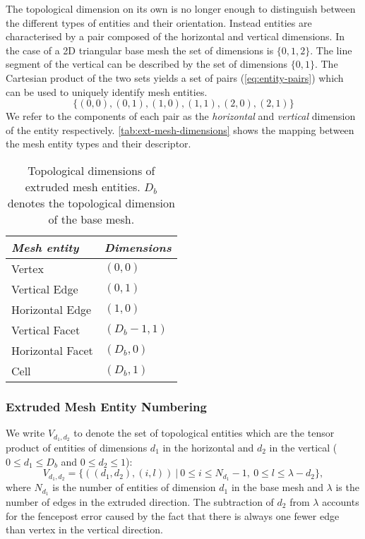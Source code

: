 \documentclass[11pt, a4paper]{scrartcl}
\begin{document}
The topological dimension on its own is no longer enough to
distinguish between the different types of entities and their
orientation. Instead entities are characterised by a pair composed of
the horizontal and vertical dimensions. In the case of a 2D triangular
base mesh the set of dimensions is $\{0, 1, 2\}$. The line segment of
the vertical can be described by the set of dimensions $\{0, 1\}$. The
Cartesian product of the two sets yields a set of pairs
(\autoref{eq:entity-pairs}) which can be used to uniquely identify
mesh entities.
\begin{equation}
\label{eq:entity-pairs}
\{ (0, 0), (0, 1), (1, 0), (1, 1), (2, 0), (2, 1) \}
\end{equation}
We refer to the components of each pair as the \textit{horizontal} and
\textit{vertical} dimension of the entity respectively.
\autoref{tab:ext-mesh-dimensions} shows the mapping between the mesh
entity types and their descriptor.
\begin{table}[htbp]
  \centering
  \begin{tabular}{l|l}
    \emph{Mesh entity} & \emph{Dimensions} \\
    \hline
    Vertex             & $(0, 0)$          \\
    Vertical Edge      & $(0, 1)$          \\
    Horizontal Edge    & $(1, 0)$          \\
    Vertical Facet     & $(D_{b}-1, 1)$    \\
    Horizontal Facet   & $(D_{b}, 0)$      \\
    Cell               & $(D_{b}, 1)$      \\
  \end{tabular}
  \caption{Topological dimensions of extruded mesh entities. $D_{b}$
    denotes the topological dimension of the base
    mesh.\label{tab:ext-mesh-dimensions}}
\end{table}

\subsubsection{Extruded Mesh Entity Numbering}
\label{sssec:entitynumbering}
We write $V_{d_{1}, d_{2}}$ to denote the set of topological entities
which are the tensor product of entities of dimensions $d_{1}$ in the
horizontal and $d_{2}$ in the vertical ($0 \leq d_{1} \leq D_{b}$ and
$0 \leq d_{2} \leq 1$):
\begin{equation}
V_{d_{1}, d_{2}}=\{ ((d_{1}, d_{2}), (i, l))\ |\  0 \leq i \leq N_{d_{1}} - 1,\ 0\leq l \leq \lambda - d_{2}\},
\end{equation}
where $N_{d_{1}}$ is the number of entities of dimension $d_{1}$ in
the base mesh and $\lambda$ is the number of edges in the extruded
direction. The subtraction of $d_{2}$ from $\lambda$ accounts for the
fencepost error caused by the fact that there is always one fewer edge
than vertex in the vertical direction.
\end{document}
